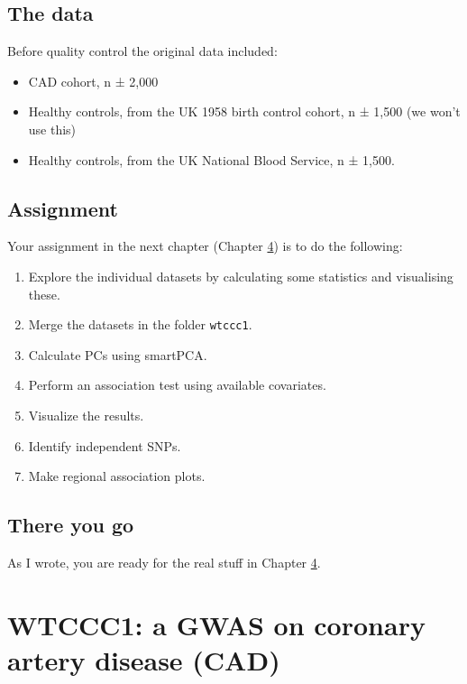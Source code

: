 \documentclass[
]{book}
\newcommand{\passthrough}[1]{#1}
\providecommand{\tightlist}{%
  \setlength{\itemsep}{0pt}\setlength{\parskip}{0pt}}
\begin{document}
\hypertarget{the-data}{%
\section{The data}\label{the-data}}

Before quality control the original data included:

\begin{itemize}
\tightlist
\item
  CAD cohort, n ± 2,000
\item
  Healthy controls, from the UK 1958 birth control cohort, n ± 1,500 (we won't use this)
\item
  Healthy controls, from the UK National Blood Service, n ± 1,500.
\end{itemize}

\hypertarget{assignment}{%
\section{Assignment}\label{assignment}}

Your assignment in the next chapter (Chapter \ref{wtccc1}) is to do the following:

\begin{enumerate}
\def\labelenumi{\arabic{enumi}.}
\tightlist
\item
  Explore the individual datasets by calculating some statistics and visualising these.
\item
  Merge the datasets in the folder \passthrough{\lstinline!wtccc1!}.
\item
  Calculate PCs using smartPCA.
\item
  Perform an association test using available covariates.
\item
  Visualize the results.
\item
  Identify independent SNPs.
\item
  Make regional association plots.
\end{enumerate}

\hypertarget{there-you-go}{%
\section{There you go}\label{there-you-go}}

As I wrote, you are ready for the real stuff in Chapter \ref{wtccc1}.

\hypertarget{wtccc1}{%
\chapter{WTCCC1: a GWAS on coronary artery disease (CAD)}\label{wtccc1}}
\end{document}
